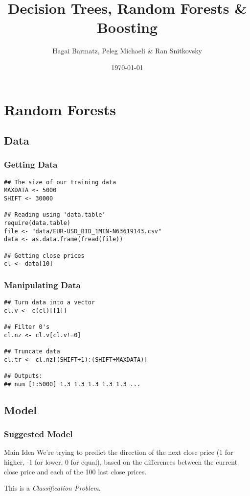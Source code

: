 \documentclass[utf8]{beamer}
\title{Decision Trees, Random Forests \& Boosting}
\author{Hagai Barmatz, Peleg Michaeli \& Ran Snitkovsky}
\institute{{\color{blue}Tel-Aviv University}}
\date{\today}
\theoremstyle{definition}
\theoremstyle{remark}
\begin{document}




\section{Random Forests}
\subsection{Data}


\begin{frame}[fragile]
  \frametitle{Getting Data}
    \begin{lstlisting}
## The size of our training data
MAXDATA <- 5000
SHIFT <- 30000

## Reading using 'data.table'
require(data.table)
file <- "data/EUR-USD_BID_1MIN-N63619143.csv"
data <- as.data.frame(fread(file))

## Getting close prices
cl <- data[10]
    \end{lstlisting}
\end{frame}
\begin{frame}[fragile]
  \frametitle{Manipulating Data}
    \begin{lstlisting}
## Turn data into a vector
cl.v <- c(cl)[[1]]

## Filter 0's
cl.nz <- cl.v[cl.v!=0]

## Truncate data
cl.tr <- cl.nz[(SHIFT+1):(SHIFT+MAXDATA)]

## Outputs:
## num [1:5000] 1.3 1.3 1.3 1.3 1.3 ...
    \end{lstlisting}
\end{frame}


\subsection{Model}
\begin{frame}
  \frametitle{Suggested Model}
  \begin{block}{Main Idea}
    We're trying to predict the direction of the next close price (1 for
    higher, -1 for lower, 0 for equal), based on the differences between the
    current close price and each of the 100 last close prices.

    This is a \emph{Classification Problem}.
  \end{block}
\end{frame}
\end{document}
